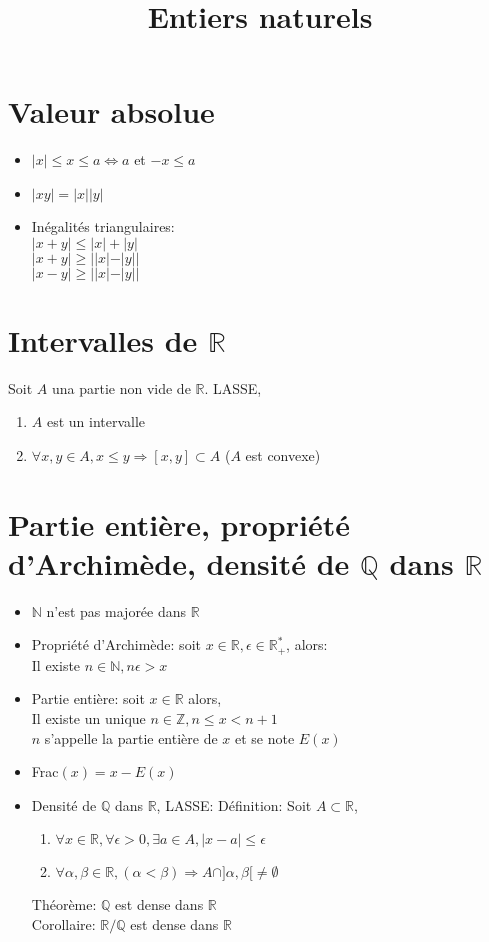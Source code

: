 \documentclass[fleqn]{article}
\title{Entiers naturels}
\date{}
\begin{document}
\maketitle

\section{Valeur absolue}
\begin{itemize}
	\item $|x| \leq x \leq a \Leftrightarrow a$ et $-x \leq a$
	\item $|xy| = |x||y|$
	\item In\'egalit\'es triangulaires: \\
		$|x+y| \leq |x| + |y|$ \\
		$|x+y| \geq ||x| - |y||$ \\
		$|x-y| \geq ||x| - |y||$
\end{itemize}

\section{Intervalles de $\mathbb{R}$}
Soit $A$ una partie non vide de $\mathbb{R}$. LASSE,
\begin{enumerate}
	\item $A$ est un intervalle
	\item $\forall x,y \in A, x \leq y \Rightarrow [x,y] \subset A$ ($A$ est convexe)
\end{enumerate}

\section{Partie entière, propri\'et\'e d'Archim\`ede, densit\'e de $\mathbb{Q}$ dans $\mathbb{R}$}
\begin{itemize}
	\item $\mathbb{N}$ n'est pas major\'ee dans $\mathbb{R}$
	\item Propri\'et\'e d'Archim\`ede: soit $x \in \mathbb{R}, \epsilon \in \mathbb{R}_+^*$, alors: \\
		Il existe $n \in \mathbb{N}, n\epsilon>x$
	\item Partie enti\`ere: soit $x \in \mathbb{R}$ alors, \\
		Il existe un unique $n \in \mathbb{Z}, n \leq x < n+1$ \\
		$n$ s'appelle la partie enti\`ere de $x$ et se note $E(x)$
	\item Frac$(x) = x - E(x)$
	\item Densit\'e de $\mathbb{Q}$ dans $\mathbb{R}$, LASSE:
		D\'efinition: Soit $A \subset \mathbb{R}$,
		\begin{enumerate}
			\item $\forall x \in \mathbb{R}, \forall \epsilon > 0, \exists a \in A, |x-a| \leq \epsilon$
			\item $\forall \alpha,\beta \in \mathbb{R}, (\alpha < \beta) \Rightarrow A \cap ]\alpha, \beta[ \neq \emptyset$
		\end{enumerate}
		Th\'eor\`eme: $\mathbb{Q}$ est dense dans $\mathbb{R}$ \\
		Corollaire: $\mathbb{R}/\mathbb{Q}$ est dense dans $\mathbb{R}$
\end{itemize}
\end{document}
